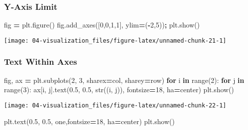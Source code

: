 \documentclass[
]{book}
\newenvironment{Shaded}{\begin{snugshade}}{\end{snugshade}}
\newcommand{\BuiltInTok}[1]{#1}
\newcommand{\ControlFlowTok}[1]{\textcolor[rgb]{0.27,0.27,0.27}{\textbf{#1}}}
\newcommand{\DecValTok}[1]{\textcolor[rgb]{0.06,0.06,0.06}{#1}}
\newcommand{\FloatTok}[1]{\textcolor[rgb]{0.06,0.06,0.06}{#1}}
\newcommand{\KeywordTok}[1]{\textcolor[rgb]{0.27,0.27,0.27}{\textbf{#1}}}
\newcommand{\NormalTok}[1]{#1}
\newcommand{\OperatorTok}[1]{\textcolor[rgb]{0.43,0.43,0.43}{\textbf{#1}}}
\newcommand{\StringTok}[1]{\textcolor[rgb]{0.5,0.5,0.5}{#1}}
\begin{document}
\hypertarget{y-axis-limit}{%
\subsubsection{Y-Axis Limit}\label{y-axis-limit}}

\begin{Shaded}
\begin{Highlighting}[]
\NormalTok{fig }\OperatorTok{=}\NormalTok{ plt.figure()}
\NormalTok{fig.add\_axes([}\DecValTok{0}\NormalTok{,}\DecValTok{0}\NormalTok{,}\DecValTok{1}\NormalTok{,}\DecValTok{1}\NormalTok{], ylim}\OperatorTok{=}\NormalTok{(}\OperatorTok{{-}}\DecValTok{2}\NormalTok{,}\DecValTok{5}\NormalTok{))}\OperatorTok{;}
\NormalTok{plt.show()}
\end{Highlighting}
\end{Shaded}

\texttt{[image: 04-visualization\_files/figure-latex/unnamed-chunk-21-1]}

\hypertarget{text-within-axes}{%
\subsubsection{Text Within Axes}\label{text-within-axes}}

\begin{Shaded}
\begin{Highlighting}[]
\NormalTok{fig, ax }\OperatorTok{=}\NormalTok{ plt.subplots(}\DecValTok{2}\NormalTok{, }\DecValTok{3}\NormalTok{, sharex}\OperatorTok{=}\StringTok{\textquotesingle{}col\textquotesingle{}}\NormalTok{, sharey}\OperatorTok{=}\StringTok{\textquotesingle{}row\textquotesingle{}}\NormalTok{)}
\ControlFlowTok{for}\NormalTok{ i }\KeywordTok{in} \BuiltInTok{range}\NormalTok{(}\DecValTok{2}\NormalTok{):}
    \ControlFlowTok{for}\NormalTok{ j }\KeywordTok{in} \BuiltInTok{range}\NormalTok{(}\DecValTok{3}\NormalTok{):}
\NormalTok{        ax[i, j].text(}\FloatTok{0.5}\NormalTok{, }\FloatTok{0.5}\NormalTok{, }\BuiltInTok{str}\NormalTok{((i, j)),}
\NormalTok{                      fontsize}\OperatorTok{=}\DecValTok{18}\NormalTok{, ha}\OperatorTok{=}\StringTok{\textquotesingle{}center\textquotesingle{}}\NormalTok{)}
\NormalTok{plt.show()}
\end{Highlighting}
\end{Shaded}

\texttt{[image: 04-visualization\_files/figure-latex/unnamed-chunk-22-1]}

\begin{Shaded}
\begin{Highlighting}[]
\NormalTok{plt.text(}\FloatTok{0.5}\NormalTok{, }\FloatTok{0.5}\NormalTok{, }\StringTok{\textquotesingle{}one\textquotesingle{}}\NormalTok{,fontsize}\OperatorTok{=}\DecValTok{18}\NormalTok{, ha}\OperatorTok{=}\StringTok{\textquotesingle{}center\textquotesingle{}}\NormalTok{)}
\NormalTok{plt.show()}
\end{Highlighting}
\end{Shaded}
\end{document}
